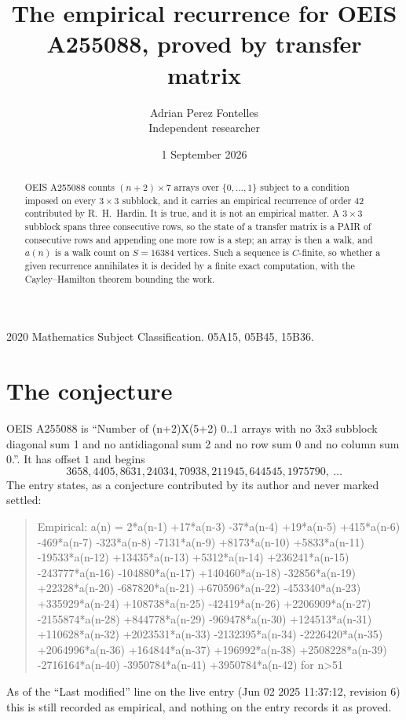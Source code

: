\documentclass[11pt,a4paper]{article}
\title{The empirical recurrence for OEIS A255088, proved by transfer matrix}
\author{Adrian Perez Fontelles\\ \small Independent researcher}
\date{1 September 2026}
\theoremstyle{plain}
\theoremstyle{definition}
\begin{document}
\maketitle

\begin{abstract}
OEIS A255088 counts $(n+2)\times7$ arrays over $\{0,\dots,1\}$ subject to a condition imposed on
every $3\times3$ subblock, and it carries an empirical recurrence of order $42$
contributed by R.~H.~Hardin. It is true, and it is not an empirical matter. A $3\times3$
subblock spans three consecutive rows, so the state of a transfer matrix is a PAIR of
consecutive rows and appending one more row is a step; an array is then a walk, and
$a(n)$ is a walk count on $S=16384$ vertices. Such a sequence is $C$-finite, so whether a given
recurrence annihilates it is decided by a finite exact computation, with the Cayley--Hamilton
theorem bounding the work.
\end{abstract}

\noindent\small 2020 Mathematics Subject Classification. 05A15, 05B45, 15B36.\normalsize

\section{The conjecture}

OEIS A255088 is ``Number of (n+2)X(5+2) 0..1 arrays with no 3x3 subblock diagonal sum 1 and no antidiagonal sum 2 and no row sum 0 and no column sum 0.''. It has offset $1$ and begins
\[
3658, 4405, 8631, 24034, 70938, 211945, 644545, 1975790,\ \dots
\]
The entry states, as a conjecture contributed by its author and never marked settled:
\begin{quote}
Empirical: a(n) = 2*a(n-1) +17*a(n-3) -37*a(n-4) +19*a(n-5) +415*a(n-6) -469*a(n-7) -323*a(n-8) -7131*a(n-9) +8173*a(n-10) +5833*a(n-11) -19533*a(n-12) +13435*a(n-13) +5312*a(n-14) +236241*a(n-15) -243777*a(n-16) -104880*a(n-17) +140460*a(n-18) -32856*a(n-19) +22328*a(n-20) -687820*a(n-21) +670596*a(n-22) -453340*a(n-23) +335929*a(n-24) +108738*a(n-25) -42419*a(n-26) +2206909*a(n-27) -2155874*a(n-28) +844778*a(n-29) -969478*a(n-30) +124513*a(n-31) +110628*a(n-32) +2023531*a(n-33) -2132395*a(n-34) -2226420*a(n-35) +2064996*a(n-36) +164844*a(n-37) +196992*a(n-38) +2508228*a(n-39) -2716164*a(n-40) -3950784*a(n-41) +3950784*a(n-42) for n>51
\end{quote}
As of the ``Last modified'' line on the live entry (Jun 02 2025 11:37:12, revision 6) this is still
recorded as empirical, and nothing on the entry records it as proved.
\end{document}

